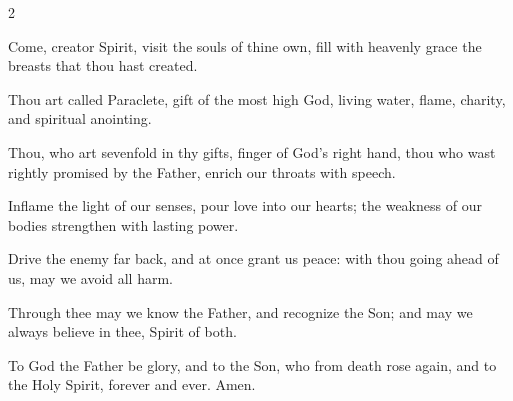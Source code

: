 \begin{multicols}{2}
\raggedcolumns
\begin{enpars}
Come, creator Spirit,
visit the souls of thine own,
fill with heavenly grace
the breasts that thou hast created.

Thou art called Paraclete,
gift of the most high God,
living water, flame, charity, and spiritual anointing.

Thou, who art sevenfold in thy gifts,
finger of God's right hand,
thou who wast rightly promised by the Father,
enrich our throats with speech.

Inflame the light of our senses,
pour love into our hearts;
the weakness of our bodies
strengthen with lasting power.

Drive the enemy far back,
and at once grant us peace:
with thou going ahead of us,
may we avoid all harm.

Through thee may we know the Father,
and recognize the Son;
and may we always believe in thee, Spirit of both.

To God the Father be glory,
and to the Son, who from death rose again,
and to the Holy Spirit, forever and ever. Amen.

\end{enpars}
\end{multicols}